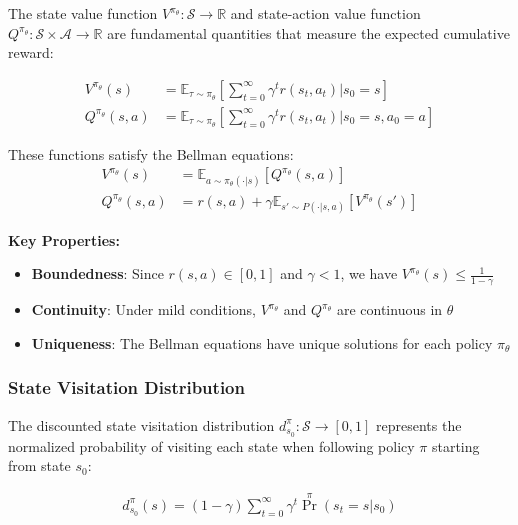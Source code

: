 The state value function $V^{\pi_\theta}: \mathcal{S} \rightarrow \mathbb{R}$ and state-action value function $Q^{\pi_\theta}: \mathcal{S} \times \mathcal{A} \rightarrow \mathbb{R}$ are fundamental quantities that measure the expected cumulative reward:

\begin{align}
    V^{\pi_\theta}(s) &= \mathbb{E}_{\tau \sim \pi_\theta} \left[ \sum_{t=0}^{\infty} \gamma^t r(s_t, a_t) \Big| s_0 = s \right] \label{eq:value_function_def}\\
    Q^{\pi_\theta}(s,a) &= \mathbb{E}_{\tau \sim \pi_\theta} \left[ \sum_{t=0}^{\infty} \gamma^t r(s_t, a_t) \Big| s_0 = s, a_0 = a \right] \label{eq:q_function_def}
\end{align}

These functions satisfy the Bellman equations:
\begin{align}
    V^{\pi_\theta}(s) &= \mathbb{E}_{a\sim \pi_\theta(\cdot|s)} [Q^{\pi_\theta}(s,a)] \label{eq:value_function}\\
    Q^{\pi_\theta}(s,a) &= r(s, a) + \gamma\mathbb{E}_{s'\sim P(\cdot|s, a)} [V^{\pi_\theta}(s')] \label{eq:q_function}
\end{align}

\textbf{Key Properties:}
\begin{itemize}
    \item \textbf{Boundedness}: Since $r(s,a) \in [0,1]$ and $\gamma < 1$, we have $V^{\pi_\theta}(s) \leq \frac{1}{1-\gamma}$
    \item \textbf{Continuity}: Under mild conditions, $V^{\pi_\theta}$ and $Q^{\pi_\theta}$ are continuous in $\theta$
    \item \textbf{Uniqueness}: The Bellman equations have unique solutions for each policy $\pi_\theta$
\end{itemize}

\subsubsection{State Visitation Distribution}

The discounted state visitation distribution $d^{\pi}_{s_0}: \mathcal{S} \rightarrow [0, 1]$ represents the normalized probability of visiting each state when following policy $\pi$ starting from state $s_0$:

\begin{align}
    d^{\pi}_{s_0}(s) = (1-\gamma)\sum_{t = 0}^{\infty}\gamma^t \Pr^{\pi}(s_t = s|s_0) \label{eq:state_visitation}
\end{align}


